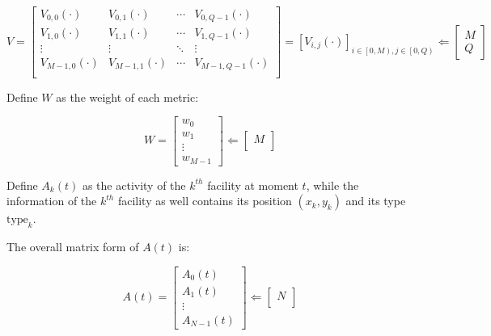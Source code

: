 \documentclass[./main.tex]{subfiles}
\begin{document}
        \begin{equation}
            \label{eq:cma}
            V=
            \begin{bmatrix}
                V_{0,0}(\cdot)&V_{0,1}(\cdot)&\cdots&V_{0,Q-1}(\cdot)\\
                V_{1,0}(\cdot)&V_{1,1}(\cdot)&\cdots&V_{1,Q-1}(\cdot)\\
                \vdots&\vdots&\ddots&\vdots\\
                V_{M-1,0}(\cdot)&V_{M-1,1}(\cdot)&\cdots&V_{M-1,Q-1}(\cdot)\\
            \end{bmatrix}
            =\left [ V_{i,j}\left ( \cdot \right )  \right ]_{i \in \left[0,M\right),j \in \left[0,Q\right)}
            \Leftarrow
            \begin{bmatrix}
                M\\
                Q
            \end{bmatrix}
        \end{equation}

        Define $W$ as the weight of each metric:

        \begin{equation}
            \label{eq:dma}
            W=
            \begin{bmatrix}
                w_0\\
                w_1\\
                \vdots\\
                w_{M-1}
            \end{bmatrix}\Leftarrow
            \begin{bmatrix}
                M\\
            \end{bmatrix}
        \end{equation}

        Define $A_k\left(t \right)$ as the activity of the $k^{th}$ facility at moment $t$, while the information of
the $
k^{th}$ facility as well contains its position $\left( x_k, y_k \right)$ and its type $\text{type}_k$.

        The overall matrix form of $A\left(t \right)$ is:

        \begin{equation}
            \label{eq:ema}
            A(t)=
            \begin{bmatrix}
                A_0(t)\\
                A_1(t)\\
                \vdots\\
                A_{N-1}(t)
            \end{bmatrix}\Leftarrow
            \begin{bmatrix}
                N\\
            \end{bmatrix}
        \end{equation}
\end{document}

